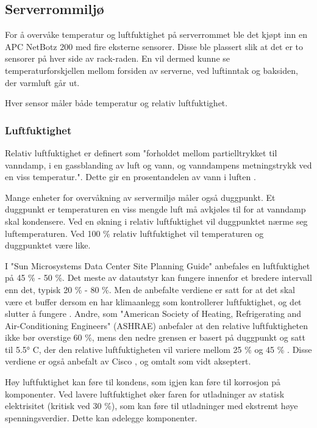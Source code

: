 \subsection{Serverrommiljø}
For å overvåke temperatur og luftfuktighet på serverrommet ble det kjøpt inn en APC NetBotz 200 \cite{netbotz2} med fire eksterne sensorer. Disse ble plassert slik at det er to sensorer på hver side av rack-raden. En vil dermed kunne se temperaturforskjellen mellom forsiden av serverne, ved luftinntak og baksiden, der varmluft går ut.

Hver sensor måler både temperatur og relativ luftfuktighet.

\subsubsection{Luftfuktighet}
Relativ luftfuktighet er definert som "forholdet mellom partielltrykket til vanndamp, i en gassblanding av luft og vann, og vanndampens metningstrykk ved en viss temperatur.". Dette gir en prosentandelen av vann i luften \cite{wiki:luftfuktighet}. 

Mange enheter for overvåkning av servermiljø måler også duggpunkt. Et duggpunkt er temperaturen en viss mengde luft må avkjøles til for at vanndamp skal kondensere. Ved en økning i relativ luftfuktighet vil duggpunktet nærme seg luftemperaturen. Ved 100 \% relativ luftfuktighet vil temperaturen og duggpunktet være like. 

I "Sun Microsystems Data Center Site Planning Guide" anbefales en luftfuktighet på 45 \% - 50 \%. Det meste av datautstyr kan fungere innenfor et bredere intervall enn det, typisk 20 \% - 80 \%. Men de anbefalte verdiene er satt for at det skal være et buffer dersom en har klimaanlegg som kontrollerer luftfuktighet, og det slutter å fungere \cite{planningserver}. Andre, som "American Society of Heating, Refrigerating and Air-Conditioning Engineers" (ASHRAE) anbefaler at den relative luftfuktigheten ikke bør overstige 60 \%, mens den nedre grensen er basert på duggpunkt og satt til 5.5° C, der den relative luftfuktigheten vil variere mellom 25 \% og 45 \% \cite{envguide}. Disse verdiene er også anbefalt av Cisco \cite{ciscoenvguide}, og omtalt som vidt akseptert. 

Høy luftfuktighet kan føre til kondens, som igjen kan føre til korrosjon på komponenter. Ved lavere luftfuktighet øker faren for utladninger av statisk elektrisitet (kritisk ved 30 \%), som kan føre til utladninger med ekstremt høye spenningsverdier. Dette kan ødelegge komponenter.

